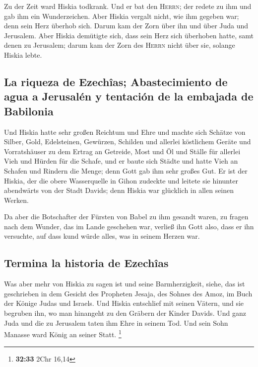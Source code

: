  Zu der Zeit ward Hiskia todkrank. Und er bat den
\textsc{Herrn}; der redete zu ihm und gab ihm ein Wunderzeichen.
 Aber Hiskia vergalt nicht, wie ihm gegeben war; denn
sein Herz überhob sich. Darum kam der Zorn über ihn und über Juda und
Jerusalem.  Aber Hiskia demütigte sich, dass sein Herz
sich überhoben hatte, samt denen zu Jerusalem; darum kam der Zorn des
\textsc{Herrn} nicht über sie, solange Hiskia lebte.

\hypertarget{la-riqueza-de-ezechuxeeas-abastecimiento-de-agua-a-jerusaluxe9n-y-tentaciuxf3n-de-la-embajada-de-babilonia}{%
\subsection{La riqueza de Ezechîas; Abastecimiento de agua a Jerusalén y
tentación de la embajada de
Babilonia}\label{la-riqueza-de-ezechuxeeas-abastecimiento-de-agua-a-jerusaluxe9n-y-tentaciuxf3n-de-la-embajada-de-babilonia}}

 Und Hiskia hatte sehr großen Reichtum und Ehre und
machte sich Schätze von Silber, Gold, Edelsteinen, Gewürzen, Schilden
und allerlei köstlichem Geräte  und Vorratshäuser zu dem
Ertrag an Getreide, Most und Öl und Ställe für allerlei Vieh und Hürden
für die Schafe,  und er baute sich Städte und hatte Vieh
an Schafen und Rindern die Menge; denn Gott gab ihm sehr großes Gut.
 Er ist der Hiskia, der die obere Wasserquelle in Gihon
zudeckte und leitete sie hinunter abendwärts von der Stadt Davids; denn
Hiskia war glücklich in allen seinen Werken.

 Da aber die Botschafter der Fürsten von Babel zu ihm
gesandt waren, zu fragen nach dem Wunder, das im Lande geschehen war,
verließ ihn Gott also, dass er ihn versuchte, auf dass kund würde alles,
was in seinem Herzen war.

\hypertarget{termina-la-historia-de-ezechuxeeas}{%
\subsection{Termina la historia de
Ezechîas}\label{termina-la-historia-de-ezechuxeeas}}

 Was aber mehr von Hiskia zu sagen ist und seine
Barmherzigkeit, siehe, das ist geschrieben in dem Gesicht des Propheten
Jesaja, des Sohnes des Amoz, im Buch der Könige Judas und Israels.
 Und Hiskia entschlief mit seinen Vätern, und sie
begruben ihn, wo man hinangeht zu den Gräbern der Kinder Davids. Und
ganz Juda und die zu Jerusalem taten ihm Ehre in seinem Tod. Und sein
Sohn Manasse ward König an seiner Statt. \footnote{\textbf{32:33} 2Chr
  16,14}

